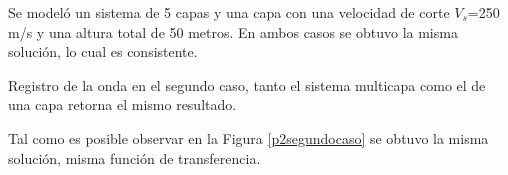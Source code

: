 \newpage
{}

Se modeló un sistema de 5 capas y una capa con una velocidad de corte $V_s$=250 m/s y una altura total de 50 metros. En ambos casos se obtuvo la misma solución, lo cual es consistente.

\begin{images}[\label{p2segundocaso}]{Registro de la onda en el segundo caso, tanto el sistema multicapa como el de una capa retorna el mismo resultado.}
\end{images}

Tal como es posible observar en la Figura \ref{p2segundocaso} se obtuvo la misma solución, misma función de transferencia.